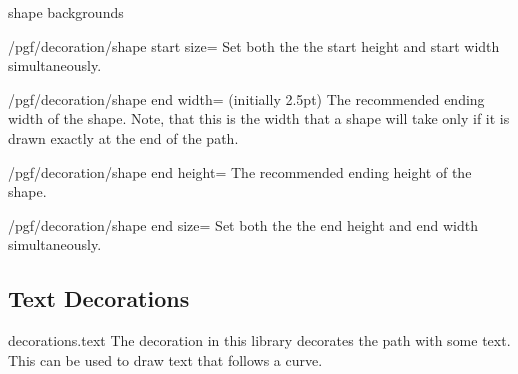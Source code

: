 \begin{decoration}{shape backgrounds}
  \begin{stylekey}{/pgf/decoration/shape start size=}
    Set both the the start height and start width simultaneously.
  \end{stylekey}%

  \begin{key}{/pgf/decoration/shape end width= (initially 2.5pt)}
    The recommended ending width of the shape. Note, that this is the
    width that a shape will take only if it is drawn exactly at the end
    of the path.


\begin{codeexample}[]    
\end{codeexample}
  \end{key}%

  \begin{key}{/pgf/decoration/shape end height=}
    The recommended ending height of the shape.
  \end{key}%

  \begin{stylekey}{/pgf/decoration/shape end size=}
    Set both the the end height and end width simultaneously.
  \end{stylekey}
\end{decoration}





\subsection{Text Decorations}

\begin{pgflibrary}{decorations.text}
  The decoration in this library decorates the path with some
  text. This can be used to draw text that follows a curve.  
\end{pgflibrary}


